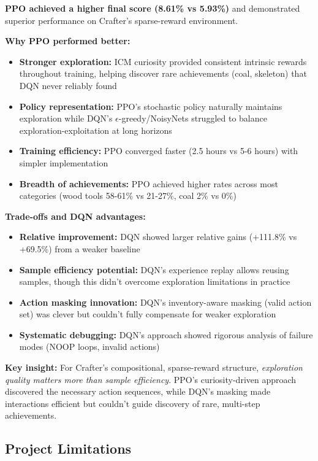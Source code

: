 \documentclass[conference]{IEEEtran}
\begin{document}
\textbf{PPO achieved a higher final score (8.61\% vs 5.93\%)} and demonstrated superior performance on Crafter's sparse-reward environment.

\textbf{Why PPO performed better:}
\begin{itemize}
    \item \textbf{Stronger exploration:} ICM curiosity provided consistent intrinsic rewards throughout training, helping discover rare achievements (coal, skeleton) that DQN never reliably found
    \item \textbf{Policy representation:} PPO's stochastic policy naturally maintains exploration while DQN's $\epsilon$-greedy/NoisyNets struggled to balance exploration-exploitation at long horizons
    \item \textbf{Training efficiency:} PPO converged faster (2.5 hours vs 5-6 hours) with simpler implementation
    \item \textbf{Breadth of achievements:} PPO achieved higher rates across most categories (wood tools 58-61\% vs 21-27\%, coal 2\% vs 0\%)
\end{itemize}

\textbf{Trade-offs and DQN advantages:}
\begin{itemize}
    \item \textbf{Relative improvement:} DQN showed larger relative gains (+111.8\% vs +69.5\%) from a weaker baseline
    \item \textbf{Sample efficiency potential:} DQN's experience replay allows reusing samples, though this didn't overcome exploration limitations in practice
    \item \textbf{Action masking innovation:} DQN's inventory-aware masking (valid action set) was clever but couldn't fully compensate for weaker exploration
    \item \textbf{Systematic debugging:} DQN's approach showed rigorous analysis of failure modes (NOOP loops, invalid actions)
\end{itemize}

\textbf{Key insight:} For Crafter's compositional, sparse-reward structure, \emph{exploration quality matters more than sample efficiency}. PPO's curiosity-driven approach discovered the necessary action sequences, while DQN's masking made interactions efficient but couldn't guide discovery of rare, multi-step achievements.

\subsection{Project Limitations}
\end{document}
